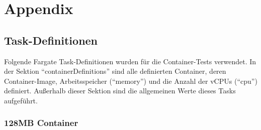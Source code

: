 \chapter{Appendix}


\section{Task-Definitionen}
Folgende Fargate Task-Definitionen wurden für die Container-Tests verwendet. In der Sektion "`containerDefinitions"' sind alle definierten Container, deren Container-Image, Arbeitsspeicher ("`memory"') und die Anzahl der vCPUs ("`cpu"') definiert. Außerhalb dieser Sektion sind die allgemeinen Werte dieses Tasks aufgeführt.

\subsection{128MB Container}

